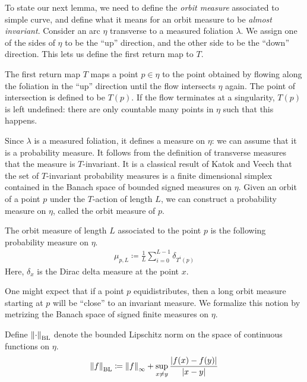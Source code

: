 \documentclass[12pt, reqno]{amsart}
\begin{document}
To state our next lemma, we need to define the \emph{orbit measure} associated to simple curve, and define what it means for an orbit measure to be \emph{almost invariant}.
Consider an arc $\eta$ transverse to a measured foliation $\lambda$.
We assign one of the sides of $\eta$ to be the ``up'' direction, and the other side to be the ``down'' direction.
This lets us define the first return map to $T$.
\begin{definition}
  The first return map $T$ maps a point $p \in \eta$ to the point obtained by flowing along the foliation in the ``up'' direction until the flow intersects $\eta$ again.
  The point of intersection is defined to be $T(p)$.
  If the flow terminates at a singularity, $T(p)$ is left undefined: there are only countable many points in $\eta$ such that this happens.
\end{definition}
Since $\lambda$ is a measured foliation, it defines a measure on $\eta$: we can assume that it is a probability measure.
It follows from the definition of transverse measures that the measure is $T$-invariant.
It is a classical result of Katok \cite{zbMATH03467479}  and Veech \cite{Veech1978} that the set of $T$-invariant probability measures is a finite dimensional simplex contained in the Banach space of bounded signed measures on $\eta$.
Given an orbit of a point $p$ under the $T$-action of length $L$, we can construct a probability measure on $\eta$, called the orbit measure of $p$.
\begin{definition}
  The orbit measure of length $L$ associated to the point $p$ is the following probability measure on $\eta$.
  \begin{align*}
    \mu_{p, L} \coloneqq \frac{1}{L} \sum_{i=0}^{L-1} \delta_{T^i(p)}
  \end{align*}
  Here, $\delta_{x}$ is the Dirac delta measure at the point $x$.
\end{definition}
One might expect that if a point $p$ equidistributes, then a long orbit measure starting at $p$ will be ``close'' to an invariant measure.
We formalize this notion by metrizing the Banach space of signed finite measures on $\eta$.
\begin{definition}
  Define $\left\lVert\cdot\right\rVert_{\mathrm{BL}}$ denote the bounded Lipschitz norm on the space of continuous functions on $\eta$.
  \begin{align*}
    \left\lVert f\right\rVert_{\mathrm{BL}} \coloneqq \left\lVert f\right\rVert_{\infty} + \sup_{x \neq y} \frac{\left| f(x) - f(y) \right|}{\left| x - y \right|}
  \end{align*}
\end{definition}
\end{document}
